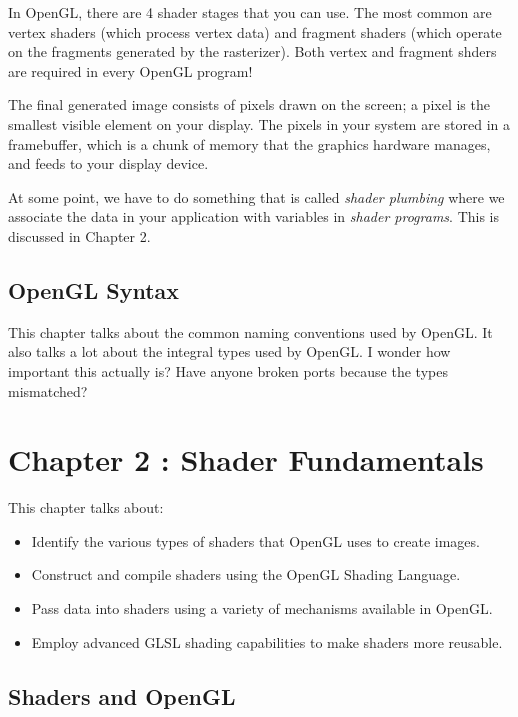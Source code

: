 \documentclass[a4paper, 14pt]{extarticle}
\begin{document}
In OpenGL, there are 4 shader stages that you can use.
The most common are vertex shaders (which process vertex data) and fragment shaders (which operate on the fragments generated by the rasterizer).
Both vertex and fragment shders are required in every OpenGL program!

The final generated image consists of pixels drawn on the screen;
a pixel is the smallest visible element on your display.
The pixels in your system are stored in a framebuffer, which is a chunk of memory that the graphics hardware manages, and feeds to your display device.

At some point, we have to do something that is called \textit{shader plumbing} where we associate the data in your application with variables in \textit{shader programs}.
This is discussed in Chapter 2.

\subsection{OpenGL Syntax}

This chapter talks about the common naming conventions used by OpenGL.
It also talks a lot about the integral types used by OpenGL.
I wonder how important this actually is?
Have anyone broken ports because the types mismatched?

\newpage
\section{Chapter 2 : Shader Fundamentals}

This chapter talks about:

\begin{itemize}
    \item
          Identify the various types of shaders that OpenGL uses to create images.

    \item
          Construct and compile shaders using the OpenGL Shading Language.

    \item
          Pass data into shaders using a variety of mechanisms available in OpenGL.

    \item
          Employ advanced GLSL shading capabilities to make shaders more reusable.

\end{itemize}

\subsection{Shaders and OpenGL}
\end{document}
